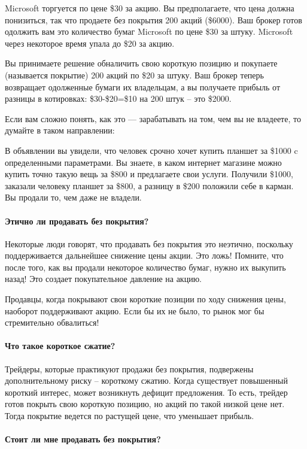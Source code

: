 \documentclass{book}
\begin{document}
Microsoft торгуется по цене \$30 за акцию. Вы предполагаете, что цена должна понизиться, так что продаете без покрытия 200 акций (\$6000). Ваш брокер готов одолжить вам это количество бумаг Microsoft по цене \$30 за штуку. Microsoft через некоторое время упала до \$20 за акцию.

Вы принимаете решение обналичить свою короткую позицию и покупаете (называется покрытие) 200 акций по \$20 за штуку. Ваш брокер теперь возвращает одолженные бумаги их владельцам, а вы получаете прибыль от разницы в котировках: \$30-\$20=\$10 на 200 штук – это \$2000.

Если вам сложно понять, как это — зарабатывать на том, чем вы не владеете, то думайте в таком направлении:

В объявлении вы увидели, что человек срочно хочет купить планшет за
\$1000 c определенными параметрами. Вы знаете, в каком интернет
магазине  можно купить точно такую вещь за \$800 и предлагаете свои
услуги. Получили \$1000, заказали человеку планшет за \$800, а разницу в
\$200 положили себе в карман. Вы продали то, чем даже не владели.

\paragraph{Этично ли продавать без покрытия?}

Некоторые люди говорят, что продавать без покрытия это неэтично, поскольку поддерживается дальнейшее снижение цены акции. Это ложь! Помните, что после того, как вы продали некоторое количество бумаг, нужно их выкупить назад! Это создает покупательное давление на акцию.

Продавцы, когда покрывают свои короткие позиции по ходу снижения цены,
наоборот поддерживают акцию. Если бы их не было, то рынок мог бы
стремительно обвалиться!

\paragraph{Что такое короткое сжатие?}

Трейдеры, которые практикуют продажи без покрытия, подвержены
дополнительному риску – короткому сжатию. Когда существует повышенный
короткий интерес, может возникнуть дефицит предложения. То есть,
трейдер готов покрыть свою короткую позицию, но акций по такой низкой
цене нет. Тогда покрытие ведется по растущей цене, что уменьшает
прибыль.

\paragraph{Стоит ли мне продавать без покрытия?}
\end{document}
